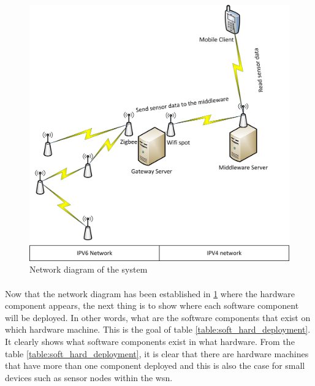 \documentclass[oneside,12pt,a4paper,final]{book}
\begin{document}
\begin{figure}[htbp]
\centering
\includegraphics[scale=0.8]{img/network_diagram.jpg}
\caption{Network diagram of the system}
\label{fig:network_diagram}
\end{figure}
\paragraph{}
Now that the network diagram has been established in \ref{fig:network_diagram} where the hardware component appears, the next thing is to show where each software component will be deployed. In other words, what are the software components that exist on which hardware machine. This is the goal of table \ref{table:soft_hard_deployment}. It clearly shows what software components exist in what hardware. From the table \ref{table:soft_hard_deployment}, it is clear that there are hardware machines that have more than one component deployed and this is also the case for small devices such as sensor nodes within the \gls{wsn}.
\end{document}

